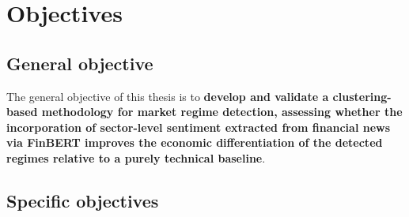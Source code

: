 \section{Objectives}
\label{sec:objectives}

\subsection{General objective}

The general objective of this thesis is to \textbf{develop and validate a
clustering-based methodology for market regime detection, assessing
whether the incorporation of sector-level sentiment extracted from
financial news via FinBERT improves the economic differentiation of the
detected regimes relative to a purely technical baseline}.

\subsection{Specific objectives}

